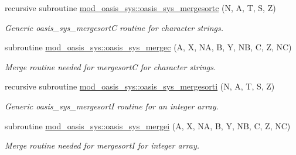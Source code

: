 \begin{DoxyCompactItemize}
recursive subroutine \hyperlink{namespacemod__oasis__sys_a30b91b7cab02c85d85fb7a7debdd5ec2}{mod\+\_\+oasis\+\_\+sys\+::oasis\+\_\+sys\+\_\+mergesortc} (N, A, T, S, Z)
\begin{DoxyCompactList}\small\item\em Generic oasis\+\_\+sys\+\_\+mergesortC routine for character strings. \end{DoxyCompactList}\item 
subroutine \hyperlink{namespacemod__oasis__sys_a27e13d259fbecbfe09e750d16f50ef25}{mod\+\_\+oasis\+\_\+sys\+::oasis\+\_\+sys\+\_\+mergec} (A, X, NA, B, Y, NB, C, Z, NC)
\begin{DoxyCompactList}\small\item\em Merge routine needed for mergesortC for character strings. \end{DoxyCompactList}\item 
recursive subroutine \hyperlink{namespacemod__oasis__sys_a298b27e03ff339d56eda3c5b31115781}{mod\+\_\+oasis\+\_\+sys\+::oasis\+\_\+sys\+\_\+mergesorti} (N, A, T, S, Z)
\begin{DoxyCompactList}\small\item\em Generic oasis\+\_\+sys\+\_\+mergesortI routine for an integer array. \end{DoxyCompactList}\item 
subroutine \hyperlink{namespacemod__oasis__sys_a5384f02abfdf4a5cee0706ddefecde87}{mod\+\_\+oasis\+\_\+sys\+::oasis\+\_\+sys\+\_\+mergei} (A, X, NA, B, Y, NB, C, Z, NC)
\begin{DoxyCompactList}\small\item\em Merge routine needed for mergesortI for integer array. \end{DoxyCompactList}\end{DoxyCompactItemize}
